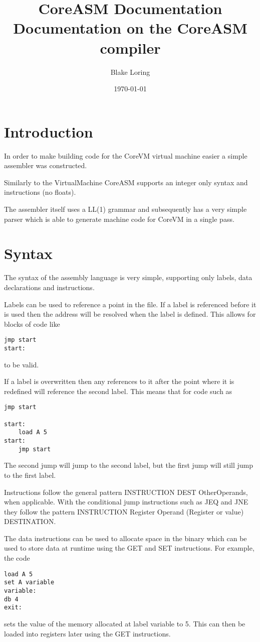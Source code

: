 \documentclass{article}
\title{CoreASM Documentation \\ \large Documentation on the CoreASM compiler}
\author{Blake Loring}
\date{\today}
\begin{document}
\maketitle

\section* {Introduction}

In order to make building code for the CoreVM virtual machine easier a simple assembler was constructed.

Similarly to the VirtualMachine CoreASM supports an integer only syntax and instructions (no floats).

The assembler itself uses a LL(1) grammar and subsequently has a very simple parser which is able to generate machine code for CoreVM in a single pass. 

\section* {Syntax}

The syntax of the assembly language is very simple, supporting only labels, data declarations and instructions.

Labels can be used to reference a point in the file. If a label is referenced before it is used then the address will be resolved when the label is defined. This allows for blocks of code like
\begin {verbatim}
jmp start
start:
\end{verbatim}
to be valid.

If a label is overwritten then any references to it after the point where it is redefined will reference the second label. This means that for code such as
\begin{verbatim}
jmp start

start:
	load A 5
start:
	jmp start
\end{verbatim}
The second jump will jump to the second label, but the first jump will still jump to the first label.

Instructions follow the general pattern INSTRUCTION DEST OtherOperands, when applicable. With the conditional jump instructions
such as JEQ and JNE they follow the pattern INSTRUCTION Register Operand (Register or value) DESTINATION.

The data instructions can be used to allocate space in the binary which can be used to store data at runtime using the GET and SET instructions.
For example, the code
\begin {verbatim}
load A 5
set A variable
variable:
db 4
exit:
\end{verbatim}
sets the value of the memory allocated at label variable to 5. This can then be loaded into registers later using the GET instructions.
\end{document}
